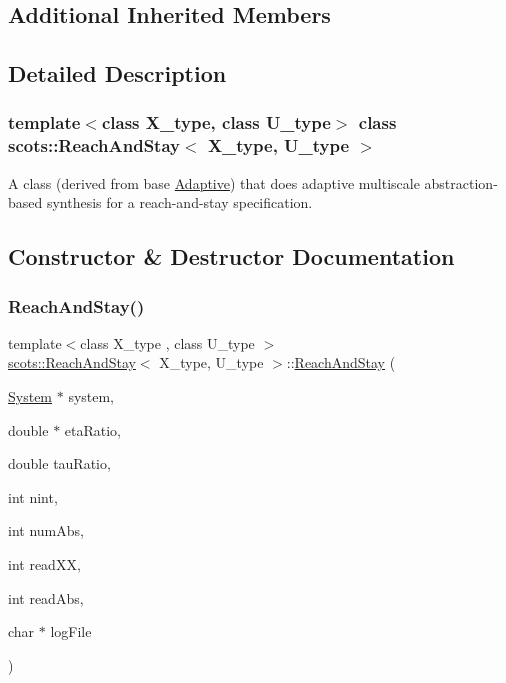 \subsection*{Additional Inherited Members}


\subsection{Detailed Description}
\subsubsection*{template$<$class X\+\_\+type, class U\+\_\+type$>$\newline
class scots\+::\+Reach\+And\+Stay$<$ X\+\_\+type, U\+\_\+type $>$}

A class (derived from base \hyperlink{classscots_1_1Adaptive}{Adaptive}) that does adaptive multiscale abstraction-\/based synthesis for a reach-\/and-\/stay specification. 

\subsection{Constructor \& Destructor Documentation}
\mbox{\label{classscots_1_1ReachAndStay_ad7b8e64bead2b77ba81d793180b66416}} 
\subsubsection{\texorpdfstring{Reach\+And\+Stay()}{ReachAndStay()}}
{\footnotesize\ttfamily template$<$class X\+\_\+type , class U\+\_\+type $>$ \\
\hyperlink{classscots_1_1ReachAndStay}{scots\+::\+Reach\+And\+Stay}$<$ X\+\_\+type, U\+\_\+type $>$\+::\hyperlink{classscots_1_1ReachAndStay}{Reach\+And\+Stay} (\begin{DoxyParamCaption}\item[{\hyperlink{classscots_1_1System}{System} $\ast$}]{system,  }\item[{double $\ast$}]{eta\+Ratio,  }\item[{double}]{tau\+Ratio,  }\item[{int}]{nint,  }\item[{int}]{num\+Abs,  }\item[{int}]{read\+XX,  }\item[{int}]{read\+Abs,  }\item[{char $\ast$}]{log\+File }\end{DoxyParamCaption})\hspace{0.3cm}{\ttfamily [inline]}}

